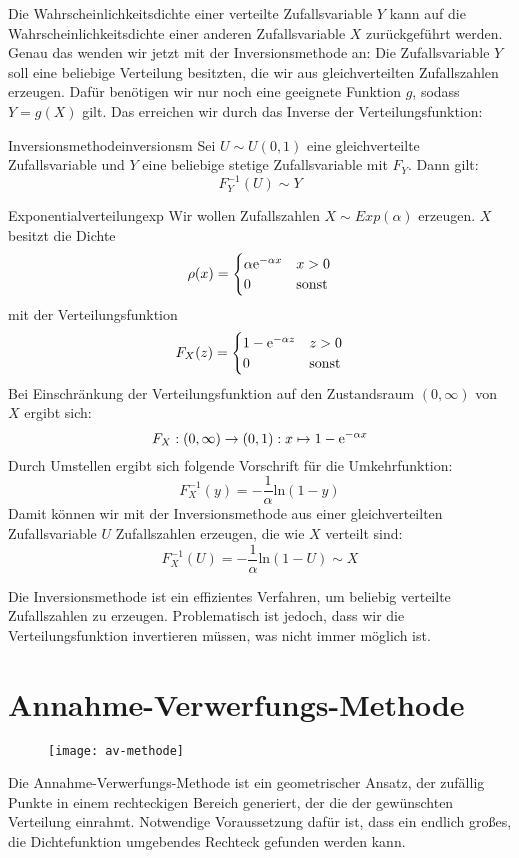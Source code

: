 Die Wahrscheinlichkeitsdichte einer verteilte Zufallsvariable $Y$ kann auf die
Wahrscheinlichkeitsdichte einer anderen Zufallsvariable $X$ zurückgeführt
werden. Genau das wenden wir jetzt mit der Inversionsmethode an: Die
Zufallsvariable $Y$ soll eine beliebige Verteilung besitzten, die wir aus
gleichverteilten Zufallszahlen erzeugen. Dafür benötigen wir nur noch eine
geeignete Funktion $g$, sodass $Y=g(X)$ gilt. Das erreichen wir durch das
Inverse der Verteilungsfunktion:

\begin{theorem}{Inversionsmethode}{inversionsm}
Sei $U\sim U(0,1)$ eine gleichverteilte Zufallsvariable und $Y$ eine
beliebige stetige Zufallsvariable mit 
$F_Y$. Dann gilt:
\[
F_Y^{-1}(U) \sim Y
\]
\end{theorem}

\begin{example}{Exponentialverteilung}{exp}
Wir wollen Zufallszahlen $X\sim Exp(\alpha)$ erzeugen. $X$ besitzt die Dichte
\[
\rho(x) = \begin{cases}
\alpha \mathrm{e}^{-\alpha x} & x > 0 \\
0 & \text{sonst}
\end{cases}
\]
mit der Verteilungsfunktion
\[
F_X(z) = \begin{cases}
1- \mathrm{e}^{-\alpha z} & z > 0 \\
0 & \text{sonst}
\end{cases}
\]
Bei Einschränkung der Verteilungsfunktion auf den Zustandsraum $(0, \infty)$ von
$X$ ergibt sich:
\[
F_X: (0,\infty)\to(0,1):x\mapsto1-\mathrm{e}^{-\alpha x}
\]
Durch Umstellen ergibt sich folgende Vorschrift für die Umkehrfunktion:
\[
F_X^{-1}(y) = -\frac{1}{\alpha} \mathrm{ln}(1-y)
\]
Damit können wir mit der Inversionsmethode aus einer gleichverteilten
Zufallsvariable $U$ Zufallszahlen erzeugen, die wie $X$ verteilt sind:
\[
F_X^{-1}(U) = -\frac{1}{\alpha} \mathrm{ln}(1-U) \sim X
\]
\end{example}

Die Inversionsmethode ist ein effizientes Verfahren, um beliebig verteilte
Zufallszahlen zu erzeugen. Problematisch ist jedoch, dass wir die
Verteilungsfunktion invertieren müssen, was nicht immer möglich ist.

\section{Annahme-Verwerfungs-Methode}

\begin{wrapfigure}{r}{0.5\textwidth}
\centering
\texttt{[image: av-methode]}
\end{wrapfigure}
Die Annahme-Verwerfungs-Methode ist ein geometrischer Ansatz, der zufällig
Punkte in einem rechteckigen Bereich generiert, der die
 der gewünschten Verteilung einrahmt.
Notwendige Voraussetzung dafür ist, dass ein endlich großes, die Dichtefunktion
umgebendes Rechteck gefunden werden kann.

